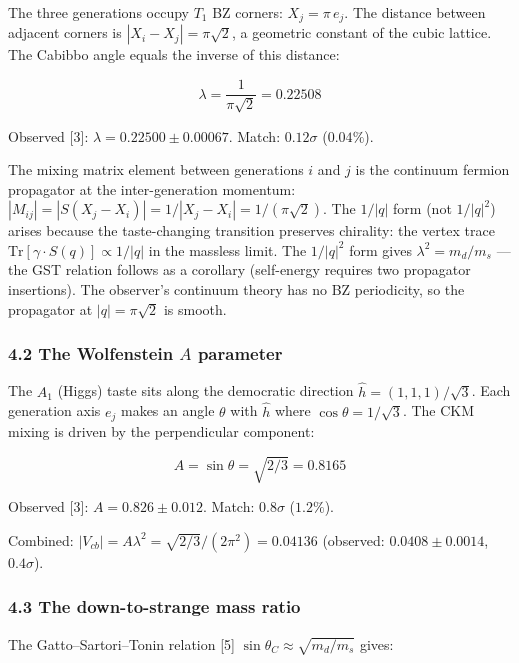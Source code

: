 \documentclass[
  11pt,
]{article}
\begin{document}
The three generations occupy \(T_1\) BZ corners: \(X_j = \pi\,e_j\). The
distance between adjacent corners is \(|X_i - X_j| = \pi\sqrt{2}\), a
geometric constant of the cubic lattice. The Cabibbo angle equals the
inverse of this distance:

\[\boxed{\lambda = \frac{1}{\pi\sqrt{2}} = 0.22508}\]

Observed {[}3{]}: \(\lambda = 0.22500 \pm 0.00067\). Match:
\(0.12\sigma\) (\(0.04\%\)).

The mixing matrix element between generations \(i\) and \(j\) is the
continuum fermion propagator at the inter-generation momentum:
\(|M_{ij}| = |S(X_j - X_i)| = 1/|X_j - X_i| = 1/(\pi\sqrt{2})\). The
\(1/|q|\) form (not \(1/|q|^2\)) arises because the taste-changing
transition preserves chirality: the vertex trace
\(\text{Tr}[\gamma \cdot S(q)] \propto 1/|q|\) in the massless limit.
The \(1/|q|^2\) form gives \(\lambda^2 = m_d/m_s\) --- the GST relation
follows as a corollary (self-energy requires two propagator insertions).
The observer's continuum theory has no BZ periodicity, so the propagator
at \(|q| = \pi\sqrt{2}\) is smooth.

\hypertarget{the-wolfenstein-a-parameter}{%
\subsubsection{\texorpdfstring{4.2 The Wolfenstein \(A\)
parameter}{4.2 The Wolfenstein A parameter}}\label{the-wolfenstein-a-parameter}}

The \(A_1\) (Higgs) taste sits along the democratic direction
\(\hat{h} = (1,1,1)/\sqrt{3}\). Each generation axis \(e_j\) makes an
angle \(\theta\) with \(\hat{h}\) where \(\cos\theta = 1/\sqrt{3}\). The
CKM mixing is driven by the perpendicular component:

\[\boxed{A = \sin\theta = \sqrt{2/3} = 0.8165}\]

Observed {[}3{]}: \(A = 0.826 \pm 0.012\). Match: \(0.8\sigma\)
(\(1.2\%\)).

Combined: \(|V_{cb}| = A\lambda^2 = \sqrt{2/3}/(2\pi^2) = 0.04136\)
(observed: \(0.0408 \pm 0.0014\), \(0.4\sigma\)).

\hypertarget{the-down-to-strange-mass-ratio}{%
\subsubsection{4.3 The down-to-strange mass
ratio}\label{the-down-to-strange-mass-ratio}}

The Gatto--Sartori--Tonin relation {[}5{]}
\(\sin\theta_C \approx \sqrt{m_d/m_s}\) gives:
\end{document}
